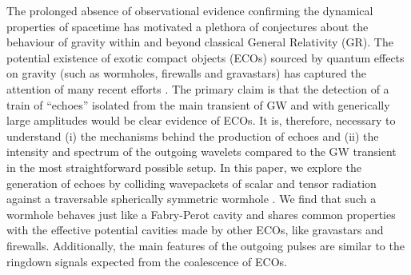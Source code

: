 \documentclass[article,aps,nofootinbib,twocolumn,superscriptaddress]{revtex4-1}
\begin{document}
The prolonged absence of observational evidence confirming the dynamical properties of spacetime has motivated a plethora of conjectures about the behaviour of gravity within and beyond \citep{Clifton:2011jh, Taliotis:2012sx, Joyce:2014kja} classical General Relativity (GR). The potential existence of exotic compact objects (ECOs) sourced by quantum effects on gravity \citep{PhysRevLett.61.1446, Almheiri:2012rt, Mazur:2001fv} (such as wormholes, firewalls and gravastars) has captured the attention of many recent efforts \citep{Kokkotas:1995av, Tominaga:1999iy, Ferrari:2000sr, Cardoso:2016oxy, Abedi:2016hgu, Price:2017cjr, Maselli:2017tfq, Volkel:2017kfj, Conklin:2017lwb, Mark:2017dnq, Bueno:2017hyj, Volkel:2018hwb, Abedi:2018npz, Wang:2018mlp, Correia:2018apm, Testa:2018bzd, Urbano:2018nrs, Chen:2019hfg}. The primary claim is that the detection of a train of ``echoes'' isolated from the main transient of GW and with generically large amplitudes would be clear evidence of ECOs. It is, therefore, necessary to understand (i) the mechanisms behind the production of echoes and (ii) the intensity and spectrum of the outgoing wavelets compared to the GW transient in the most straightforward possible setup. In this paper, we explore the generation of echoes by colliding wavepackets of scalar and tensor radiation against a traversable spherically symmetric wormhole \citep{Visser:1989kh}. We find that such a wormhole behaves just like a Fabry-Perot cavity and shares common properties with the effective potential cavities made by other ECOs, like gravastars and firewalls. Additionally, the main features of the outgoing pulses are similar to the ringdown signals expected from the coalescence of ECOs.
\end{document}
